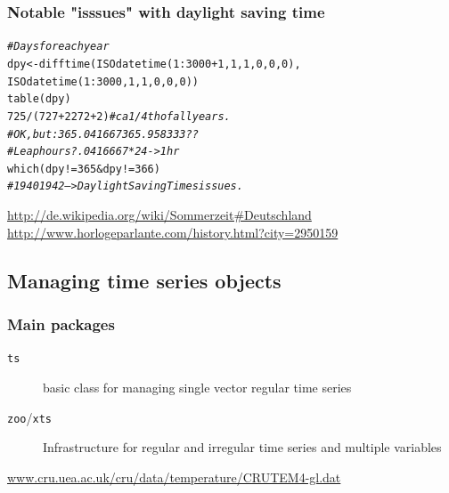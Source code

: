 \documentclass[xcolor=table, xcolor=dvipsnames]{beamer}\usepackage[]{graphicx}\usepackage[]{color}
\makeatletter
\newcommand{\hlnum}[1]{\textcolor[rgb]{0,0,0}{#1}}
\newcommand{\hlcom}[1]{\textcolor[rgb]{0,0.392,0}{\textit{#1}}}
\newcommand{\hlopt}[1]{\textcolor[rgb]{0,0,0}{#1}}
\newcommand{\hlstd}[1]{\textcolor[rgb]{0,0,0}{#1}}
\newcommand{\hlkwb}[1]{\textcolor[rgb]{0,0,0}{#1}}
\newcommand{\hlkwd}[1]{\textcolor[rgb]{0,0,1}{#1}}
\newenvironment{kframe}{%
 \def\at@end@of@kframe{}%
 \ifinner\ifhmode%
  \def\at@end@of@kframe{\end{minipage}}%
  \begin{minipage}{\columnwidth}%
 \fi\fi%
 \def\FrameCommand##1{\hskip\@totalleftmargin \hskip-\fboxsep
 \colorbox{shadecolor}{##1}\hskip-\fboxsep
     \hskip-\linewidth \hskip-\@totalleftmargin \hskip\columnwidth}%
 \MakeFramed {\advance\hsize-\width
   \@totalleftmargin\z@ \linewidth\hsize
   \@setminipage}}%
 {\par\unskip\endMakeFramed%
 \at@end@of@kframe}
\newenvironment{knitrout}{}{} %
\makeatother
\begin{document}
\begin{frame}[fragile]\frametitle{Notable "isssues" with daylight saving time}
\begin{knitrout}
\color{fgcolor}\begin{kframe}
\begin{alltt}
\hlcom{# Days for each year}
\hlstd{dpy} \hlkwb{<-} \hlkwd{difftime}\hlstd{(}\hlkwd{ISOdatetime}\hlstd{(}\hlnum{1}\hlopt{:}\hlnum{3000}\hlopt{+}\hlnum{1}\hlstd{,}\hlnum{1}\hlstd{,}\hlnum{1}\hlstd{,} \hlnum{0}\hlstd{,}\hlnum{0}\hlstd{,}\hlnum{0}\hlstd{),}
                \hlkwd{ISOdatetime}\hlstd{(}\hlnum{1}\hlopt{:}\hlnum{3000}\hlstd{,}\hlnum{1}\hlstd{,}\hlnum{1}\hlstd{,} \hlnum{0}\hlstd{,}\hlnum{0}\hlstd{,}\hlnum{0}\hlstd{))}
\hlkwd{table}\hlstd{(dpy)}
\hlnum{725} \hlopt{/} \hlstd{(}\hlnum{727}\hlopt{+}\hlnum{2272}\hlopt{+}\hlnum{2}\hlstd{)} \hlcom{# ca 1/4th of all years. }
\hlcom{# OK, but: 365.041667 365.958333 ??}
\hlcom{# Leap hours? .0416667*24 -> 1 hr}
\hlkwd{which}\hlstd{(dpy} \hlopt{!=} \hlnum{365} \hlopt{&} \hlstd{dpy} \hlopt{!=} \hlnum{366}\hlstd{)}
\hlcom{# 1940 1942 --> Daylight Saving Times issues.}
\end{alltt}
\end{kframe}
\end{knitrout}
\href{http://de.wikipedia.org/wiki/Sommerzeit\#Deutschland}{http://de.wikipedia.org/wiki/Sommerzeit\#Deutschland}\\
\href{http://www.horlogeparlante.com/history.html?city=2950159}{http://www.horlogeparlante.com/history.html?city=2950159}
\end{frame}

\subsection{Managing time series objects}

\begin{frame}[fragile]\frametitle{Main packages}
\begin{description}
\item[\texttt{ts}] basic class for managing single vector regular time series\\
\item[\texttt{zoo}/\texttt{xts}] Infrastructure for regular and irregular time series and multiple variables\\
\end{description}
\href{http://www.cru.uea.ac.uk/cru/data/temperature/CRUTEM4-gl.dat}{www.cru.uea.ac.uk/cru/data/temperature/CRUTEM4-gl.dat}
\end{frame}
\end{document}
